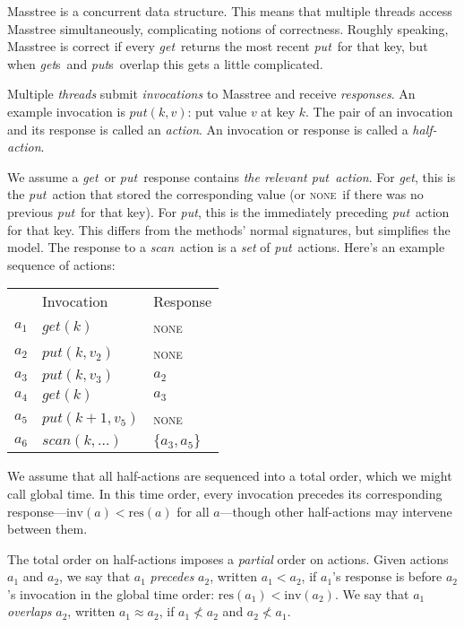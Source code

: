 \documentclass[11pt]{article}
\newcommand{\NONE}{\textsc{none}}
\newcommand{\sysget}{\textit{get}}
\newcommand{\sysgets}{\textit{get\/}s}
\newcommand{\sysput}{\textit{put}}
\newcommand{\sysputs}{\textit{put\/}s}
\newcommand{\sysscan}{\textit{scan}}
\newcommand{\Inv}[1]{\ensuremath{\textrm{inv}(#1)}}
\newcommand{\Res}[1]{\ensuremath{\textrm{res}(#1)}}
\newcommand{\Precedes}{<}
\newcommand{\NotPrecedes}{\not <}
\newcommand{\Overlaps}{\approx}
\begin{document}
Masstree is a concurrent data structure. This means that multiple threads access Masstree simultaneously, complicating notions of correctness. Roughly speaking, Masstree is correct if every \sysget\ returns the most recent \sysput\ for that key, but when \sysgets\ and \sysputs\ overlap this gets a little complicated.

Multiple \emph{threads} submit \emph{invocations} to Masstree and
receive \emph{responses}. An example invocation is \(\sysput(k,v)\): put
value $v$ at key $k$. The pair of an invocation and its response is
called an \emph{action}. An invocation or response is
called a \emph{half-action}.

We assume a \sysget\ or \sysput\ response contains \emph{the
relevant \sysput\ action}. For \sysget, this is the \sysput\ action that
stored the corresponding value (or \NONE\ if there was no previous
\sysput\ for that key). For \sysput, this is the immediately preceding
\sysput\ action for that key. This differs from the methods' normal
signatures, but simplifies the model. The response to a \sysscan\ action
is a \emph{set} of \sysput\ actions. Here's an example sequence of
actions:

\begin{flushleft}
\begin{tabular}{@{}rll}
& Invocation & Response \\
$a_1$ & $\sysget(k)$ & \NONE \\
$a_2$ & $\sysput(k, v_2)$ & \NONE \\
$a_3$ & $\sysput(k, v_3)$ & $a_2$ \\
$a_4$ & $\sysget(k)$ & $a_3$ \\
$a_5$ & $\sysput(k+1, v_5)$ & \NONE \\
$a_6$ & $\sysscan(k, \dots)$ & $\{a_3,a_5\}$ \\
\end{tabular}
\end{flushleft}

We assume that all half-actions are sequenced into a total order, which
we might call global time. In this time order, every invocation precedes
its corresponding response---$\Inv{a} < \Res{a}$ for all
$a$---though other half-actions may intervene between them.

The total order on half-actions imposes a \emph{partial} order on
actions. Given actions $a_1$ and $a_2$, we say that $a_1$
\emph{precedes} $a_2$, written $a_1 \Precedes a_2$, if $a_1$'s
response is before $a_2$'s invocation in the global time order:
$\Res{a_1} < \Inv{a_2}$. We say that $a_1$ \emph{overlaps} $a_2$,
written $a_1 \Overlaps a_2$, if $a_1 \NotPrecedes a_2$ and $a_2
\NotPrecedes a_1$.
\end{document}
